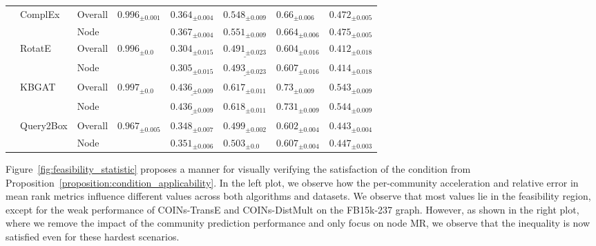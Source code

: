 \begin{table}[!ht]
\begin{adjustbox}{width=\textwidth}
\begin{tabular}{llllllll}
         & ComplEx & Overall &  ${{0.996}_{\pm 0.001}}$ &     $\mathbf{{0.364}_{\pm 0.004}}$ &     $\mathbf{{0.548}_{\pm 0.009}}$ &      $\mathbf{{0.66}_{\pm 0.006}}$ &     $\mathbf{{0.472}_{\pm 0.005}}$ \\
         &           & Node &                          &     $\mathbf{{0.367}_{\pm 0.004}}$ &     $\mathbf{{0.551}_{\pm 0.009}}$ &     $\mathbf{{0.664}_{\pm 0.006}}$ &     $\mathbf{{0.475}_{\pm 0.005}}$ \\
         & RotatE & Overall &    ${{0.996}_{\pm 0.0}}$ &            ${{0.304}_{\pm 0.015}}$ &  $\underline{{0.491}_{\pm 0.023}}$ &     $\mathbf{{0.604}_{\pm 0.016}}$ &            ${{0.412}_{\pm 0.018}}$ \\
         &           & Node &                          &            ${{0.305}_{\pm 0.015}}$ &  $\underline{{0.493}_{\pm 0.023}}$ &     $\mathbf{{0.607}_{\pm 0.016}}$ &            ${{0.414}_{\pm 0.018}}$ \\
         & KBGAT & Overall &    ${{0.997}_{\pm 0.0}}$ &  $\underline{{0.436}_{\pm 0.009}}$ &     $\mathbf{{0.617}_{\pm 0.011}}$ &      $\mathbf{{0.73}_{\pm 0.009}}$ &     $\mathbf{{0.543}_{\pm 0.009}}$ \\
         &           & Node &                          &  $\underline{{0.436}_{\pm 0.009}}$ &     $\mathbf{{0.618}_{\pm 0.011}}$ &     $\mathbf{{0.731}_{\pm 0.009}}$ &     $\mathbf{{0.544}_{\pm 0.009}}$ \\
         & Query2Box & Overall &  ${{0.967}_{\pm 0.005}}$ &     $\mathbf{{0.348}_{\pm 0.007}}$ &     $\mathbf{{0.499}_{\pm 0.002}}$ &     $\mathbf{{0.602}_{\pm 0.004}}$ &     $\mathbf{{0.443}_{\pm 0.004}}$ \\
         &           & Node &                          &     $\mathbf{{0.351}_{\pm 0.006}}$ &       $\mathbf{{0.503}_{\pm 0.0}}$ &     $\mathbf{{0.607}_{\pm 0.004}}$ &     $\mathbf{{0.447}_{\pm 0.003}}$ \\
\bottomrule
\end{tabular}
    \end{adjustbox}
\end{table}%

Figure~\ref{fig:feasibility_statistic} proposes a manner for visually verifying the satisfaction of the condition from Proposition~\ref{proposition:condition_applicability}. In the left plot, we observe how the per-community acceleration and relative error in mean rank metrics influence different values across both algorithms and datasets. We observe that most values lie in the feasibility region, except for the weak performance of COINs-TransE and COINs-DistMult on the FB15k-237 graph. However, as shown in the right plot, where we remove the impact of the community prediction performance and only focus on node MR, we observe that the inequality is now satisfied even for these hardest scenarios.

